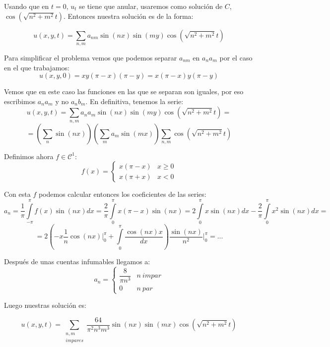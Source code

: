\documentclass[openany]{book}
\begin{document}
\begin{exercise}
  Usando que en $ t=0 $, $ u_{t} $ se tiene que anular, usaremos como solución de $ C $, $ \cos(\sqrt{n^2+m^2}t) $. Entonces nuestra solución es de la forma:

  $$ u(x,y,t) = \sum\limits_{n,m}^{}a_{nm}\sin(nx)\sin(my) \cos(\sqrt{n^2+m^2}t) $$

  Para simplificar el problema vemos que podemos separar $ a_{nm} $ en $ a_na_m $ por el caso en el que trabajamos:
  $$ u(x,y,0) = xy(\pi-x)(\pi-y) = x(\pi-x)y(\pi-y) $$

  Vemos que en este caso las funciones en las que se separan son iguales, por eso escribimos $ a_na_m $ y no $ a_nb_m $. En definitiva, tenemos la serie:
  $$ u(x,y,t) =  \sum\limits_{n,m}^{} a_na_m \sin(nx) \sin(my) \cos(\sqrt{n^2+m^2}t) = $$ 
  $$ =\left( \sum\limits_{n}^{}\sin(nx) \right) \left( \sum\limits_{m}^{}a_m \sin(mx) \right) \sum\limits_{n,m}^{} \cos(\sqrt{n^2+m^2}t) $$

  Definimos ahora $ f \in \mathcal{C}^1$:
  $$ f(x) = \left\{
  \begin{array}{ll}
    x(\pi-x) & x\geq 0 \\ 
    x(\pi+x) & x<0
  \end{array}
  \right. $$
  
  Con esta $ f $ podemos calcular entonces los coeficientes de las series:
  $$ a_n = \dfrac{1}{\pi} \int\limits_{-\pi}^{\pi}f(x) \sin(nx)dx = \dfrac{2}{\pi} \int\limits_{0}^{\pi}x (\pi-x)\sin(nx) = 2 \int\limits_{0}^{\pi}x \sin(nx)dx -\dfrac{2}{\pi} \int\limits_{0}^{\pi}x^2 \sin(nx)dx = $$
  $$  = 2 \left( -x \dfrac{1}{n}\cos(nx) \Biggr|_{0}^{\pi} + \int\limits_{0}^{\pi} \dfrac{\cos(nx)x}{dx} \right) \dfrac{\sin(nx)}{n^2} \Biggr|_{0}^{\pi}  = ...$$

  Después de unas cuentas infumables llegamos a:
  $$ a_n = \left\{
  \begin{array}{ll}
    \dfrac{8}{\pi n^3} & n\ impar\\ 
    0 & n\ par
  \end{array}
  \right. $$
  
  Luego nuestras solución es:

  $$ u(x,y,t) = \sum\limits _{\substack{n,m\\ impares}}^{} \dfrac{64}{\pi^2n ^3m^3} \sin(nx)\sin(mx)\cos(\sqrt{n^2+m^2}t) $$

\end{exercise}
\end{document}
